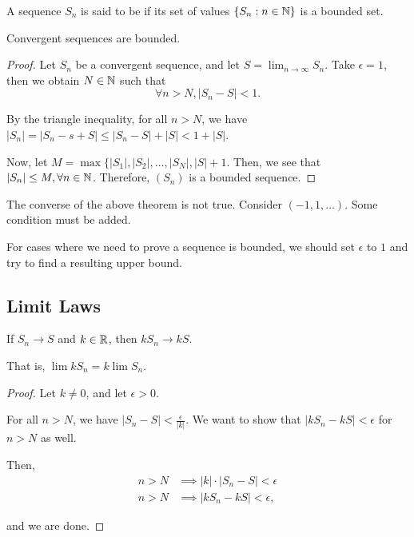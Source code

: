 \documentclass{book}
\begin{document}
\begin{defn}
    A sequence $S_n$ is said to be  if its set of values $\{S_n : n \in \mathbb{N}\}$ is a bounded set.
\end{defn}

\begin{thm}
    Convergent sequences are bounded.
\end{thm}

\begin{proof}
    Let $S_n$ be a convergent sequence, and let $S = \lim_{n \to \infty} S_n$. Take $\epsilon = 1$, then we obtain $N \in \mathbb{N}$ such that \[\forall n > N, |S_n - S| < 1.\] 

    By the triangle inequality, for all $n > N$, we have $|S_n| = |S_n - s + S| \leq |S_n - S| + |S| < 1 + |S|$.

    Now, let $M = \max\{|S_1|, |S_2|, \ldots, |S_N|, |S| + 1$. Then, we see that $|S_n| \leq M, \forall n \in \mathbb{N}$. Therefore, $(S_n)$ is a bounded sequence.
\end{proof}

\begin{remark}
    The converse of the above theorem is not true. Consider $(-1, 1, \ldots)$. Some condition must be added.
\end{remark}

For cases where we need to prove a sequence is bounded, we should set $\epsilon$ to $1$ and try to find a resulting upper bound.

\subsection{Limit Laws}
\begin{thm}
    If $S_n \to S$ and $k \in \mathbb{R}$, then $k S_n \to k S$. 

    That is, $\lim kS_n = k \lim S_n$.
\end{thm}

\begin{proof}
    Let $k \neq 0$, and let $\epsilon > 0$.

    For all $n > N$, we have $|S_n - S| < \frac{\epsilon}{|k|}$. We want to show that $|kS_n - kS| < \epsilon$ for $n > N$ as well.

    Then, \begin{align*}
        n > N &\implies |k| \cdot |S_n - S| < \epsilon \\
        n > N &\implies |k S_n - k S| < \epsilon,
    \end{align*}

    and we are done.
\end{proof}
\end{document}
